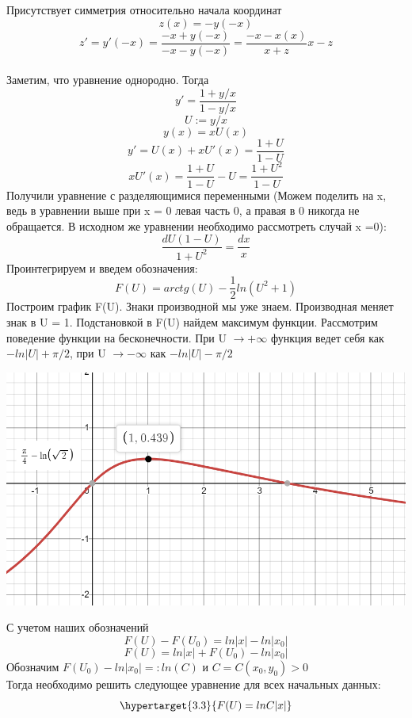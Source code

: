 \documentclass[10pt]{report}
\begin{document}
Присутствует симметрия относительно начала координат \[
z(x)  =-y(-x)\]
\[
z'= y'(-x) = \frac {-x+y(-x)} { -x - y(-x)} = \frac {-x-x(x)} {x+z} {x-z}\]\\


Заметим, что уравнение однородно. Тогда  
\[ y' = \frac {1+y/x} {1 - y/ x}\]
\[
U := y/x\]
\[
y(x) = xU(x)\]
\[y' = U(x) + xU'(x)= \frac {1+U} {1-U}\]\[
xU'(x) = \frac {1+U} {1-U} - U = \frac {1+U^2} {1 - U}\]
Получили уравнение с разделяющимися переменными (Можем поделить на x, ведь в уравнении выше при x = 0 левая часть 0, а правая в 0 никогда не обращается. В исходном же уравнении необходимо рассмотреть случай x =0):
\[
\frac {dU(1-U)} {1+U^2} = \frac {dx} {x}\]
Проинтегрируем и введем обозначения:
\[
F(U) = arctg (U) - \frac 1 2 ln(U^2 +1)\]
Построим график F(U). Знаки производной мы уже знаем. Производная меняет знак в U = 1. Подстановкой в F(U) найдем максимум функции. Рассмотрим поведение функции на бесконечности. При U $\rightarrow +\infty$ функция ведет себя как $-ln|U|+\pi/2$, при U $\rightarrow -\infty$ как $  -ln|U|- \pi/2$
\begin{center}
{\includegraphics[scale=0.48]{graph3.2.png}} 
\end{center}
С учетом наших обозначений
\[
F(U)-F(U_0) = ln|x|-ln|x_0|\]
\[
F(U) = ln|x| + F(U_0) - ln|x_0|\]
Обозначим $ F(U_0) - ln|x_0| =: ln(C)$ и $C  = C (x_0, y_0)>0$
\\
Тогда необходимо решить следующее уравнение для всех начальных данных:
\begin{equation}
\hypertarget{3.3}{F(U) = lnC|x|}
\end{equation}
\end{document}
